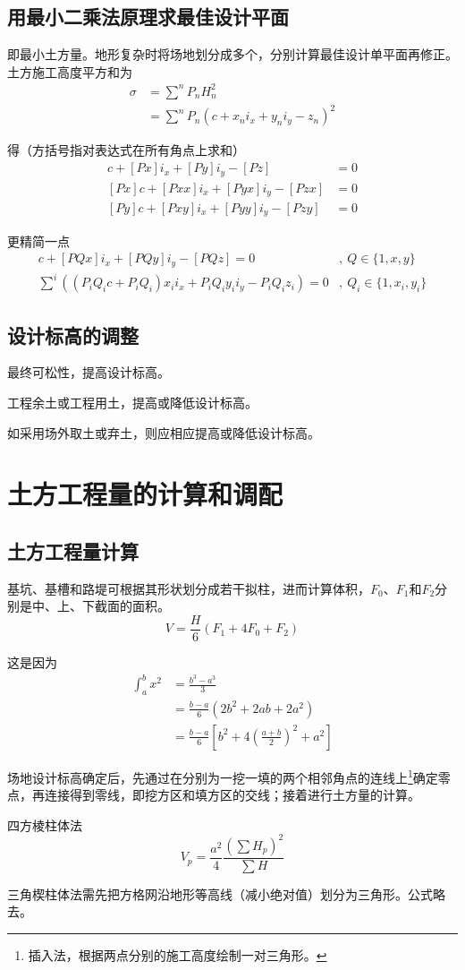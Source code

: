 \documentclass{book}
\begin{document}
\subsection{用最小二乘法原理求最佳设计平面}
\par 即最小土方量。地形复杂时将场地划分成多个，分别计算最佳设计单平面再修正。土方施工高度平方和为
\begin{align*}
    \sigma & = \sum^n P_n H_n^2                  \\
           & = \sum^n P_n(c+x_ni_x+y_ni_y-z_n)^2
\end{align*}
\par 得（方括号指对表达式在所有角点上求和）
\begin{align*}
    [P]c + [Px]i_x + [Py]i_y - [Pz]     & = 0 \\
    [Px]c + [Pxx]i_x + [Pyx]i_y - [Pzx] & = 0 \\
    [Py]c + [Pxy]i_x + [Pyy]i_y - [Pzy] & = 0
\end{align*}
\par 更精简一点
\begin{align*}
    [PQ]c + [PQx]i_x + [PQy]i_y - [PQz] = 0                          & ,\ Q \in \{1, x, y\}       \\
    \sum^i ((P_iQ_ic + P_iQ_i)x_ii_x + P_iQ_iy_ii_y - P_iQ_iz_i) = 0 & ,\ Q_i \in \{1, x_i, y_i\}
\end{align*}
\subsection{设计标高的调整}
\par 最终可松性，提高设计标高。
\par 工程余土或工程用土，提高或降低设计标高。
\par 如采用场外取土或弃土，则应相应提高或降低设计标高。
\section{土方工程量的计算和调配}
\subsection{土方工程量计算}
\par 基坑、基槽和路堤可根据其形状划分成若干拟柱，进而计算体积，$F_0$、$F_1$和$F_2$分别是中、上、下截面的面积。
$$
    V = \frac{H}{6}(F_1+4F_0+F_2)
$$
\par 这是因为
\begin{align*}
    \int_a^b x^2 & = \frac{b^3-a^3}{3}                          \\
                 & = \frac{b-a}{6} (2b^2+2ab+2a^2)              \\
                 & = \frac{b-a}{6} [b^2+4(\frac{a+b}{2})^2+a^2]
\end{align*}
\par 场地设计标高确定后，先通过在分别为一挖一填的两个相邻角点的连线上\footnote{插入法，根据两点分别的施工高度绘制一对三角形。}确定零点，再连接得到零线，即挖方区和填方区的交线；接着进行土方量的计算。
\par 四方棱柱体法
$$
    V_p = \frac{a^2}{4} \frac{(\sum H_p)^2}{\sum H}
$$
\par 三角楔柱体法需先把方格网沿地形等高线（减小绝对值）划分为三角形。公式略去。
\end{document}
